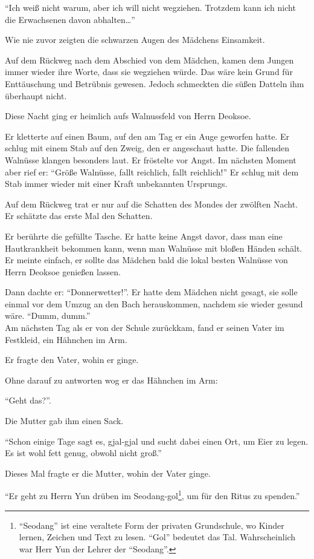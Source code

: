 \documentclass[prd,12pt,tightenlines,notitlepage,nofootinbib]{revtex4-1}
\begin{document}
"`Ich weiß nicht warum, aber ich will nicht wegziehen.
Trotzdem kann ich nicht die Erwachsenen davon abhalten\ldots"'

Wie nie zuvor zeigten die schwarzen Augen des Mädchens Einsamkeit.

Auf dem Rückweg nach dem Abschied von dem Mädchen,
kamen dem Jungen immer wieder ihre Worte, dass sie wegziehen würde.
Das wäre kein Grund für Enttäuschung und Betrübnis gewesen.
Jedoch schmeckten die süßen Datteln ihm überhaupt nicht.

Diese Nacht ging er heimlich aufs Walnussfeld von Herrn Deoksoe.

Er kletterte auf einen Baum, auf den am Tag er ein Auge geworfen hatte.
Er schlug mit einem Stab auf den Zweig, den er angeschaut hatte.
Die fallenden Walnüsse klangen besonders laut.
Er fröstelte vor Angst.
Im nächsten Moment aber rief er: "`Größe Walnüsse, fallt reichlich, fallt reichlich!"'
Er schlug mit dem Stab immer wieder mit einer Kraft unbekannten Ursprungs.

Auf dem Rückweg trat er nur auf die Schatten des Mondes der zwölften Nacht.
Er schätzte das erste Mal den Schatten.

Er berührte die gefüllte Tasche.
Er hatte keine Angst davor, dass
man eine Hautkrankheit bekommen kann, wenn
man Walnüsse mit bloßen Händen schält.
Er meinte einfach,
er sollte das Mädchen bald die lokal besten Walnüsse von Herrn Deoksoe
genießen lassen.

Dann dachte er: "`Donnerwetter!"'.
Er hatte dem Mädchen nicht gesagt,
sie solle einmal vor dem Umzug an den Bach herauskommen,
nachdem sie wieder gesund wäre.
"`Dumm, dumm."'
\\

Am nächsten Tag als er von der Schule zurückkam,
fand er seinen Vater im Festkleid, ein Hähnchen im Arm. %

Er fragte den Vater, wohin er ginge.

Ohne darauf zu antworten wog er das Hähnchen im Arm:

"`Geht das?"'.

Die Mutter gab ihm einen Sack.

"`Schon einige Tage sagt es, gjal-gjal
und sucht dabei einen Ort, um Eier zu legen.
Es ist wohl fett genug, obwohl nicht groß."'

Dieses Mal fragte er die Mutter, wohin der Vater ginge.

"`Er geht zu Herrn Yun drüben im Seodang-gol\footnote{
"`Seodang"' ist eine veraltete Form der privaten Grundschule,
wo Kinder lernen,
Zeichen und Text zu lesen.
"`Gol"' bedeutet das Tal.
Wahrscheinlich war Herr Yun der Lehrer der "`Seodang"'.},
um für den Ritus zu spenden."'
\end{document}
